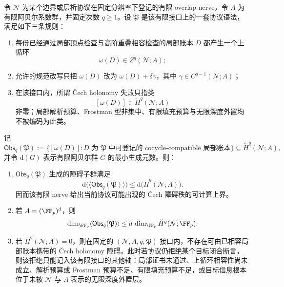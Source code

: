 \begin{theorem}\label{distill:cech_cohomology-finite_nerve_obstruction_bounds-typed-boundary-nerve-rank-ceiling}
令 \(\mathcal N\) 为某个边界或层析协议在固定分辨率下登记的有限 overlap nerve，令 \(A\) 为有限阿贝尔系数群，并固定次数 \(q\ge1\)。设 \(\mathfrak P\) 是该有限接口上的一套协议语法，满足如下三条规则：
\begin{enumerate}
  \item 每份已经通过局部顶点检查与高阶重叠相容检查的局部账本 \(D\) 都产生一个上循环
  \[
  \omega(D)\in Z^q(\mathcal N;A);
  \]
  \item 允许的规范改写只把 \(\omega(D)\) 改为 \(\omega(D)+\delta\gamma\)，其中 \(\gamma\in C^{q-1}(\mathcal N;A)\)；
  \item 在该接口内，所谓 \v Cech holonomy 失败只指类
  \[
  [\omega(D)]\in \check H^q(\mathcal N;A)
  \]
  非零；局部解析预算、Frostman 型非集中、有限填充预算与无限深度外置均不被编码为此类。
\end{enumerate}
记
\[
\mathsf{Obs}_q(\mathfrak P)
:=\{[\omega(D)]:D\text{ 为 }\mathfrak P\text{ 中可登记的 cocycle-compatible 局部账本}\}
\subseteq \check H^q(\mathcal N;A),
\]
并令 \(\mathrm d(G)\) 表示有限阿贝尔群 \(G\) 的最小生成元数。则：
\begin{enumerate}
  \item \(\mathsf{Obs}_q(\mathfrak P)\) 生成的障碍子群满足
  \[
  \mathrm d\bigl(\langle\mathsf{Obs}_q(\mathfrak P)\rangle\bigr)
  \le
  \mathrm d\bigl(\check H^q(\mathcal N;A)\bigr).
  \]
  因而该有限 nerve 给出当前协议可能出现的 \v Cech 障碍秩的可计算上界。
  \item 若 \(A=(\FF_p)^d\)，则
  \[
  \dim_{\FF_p}\langle\mathsf{Obs}_q(\mathfrak P)\rangle
  \le
  d\,\dim_{\FF_p}\check H^q(\mathcal N;\FF_p).
  \]
  \item 若 \(\check H^q(\mathcal N;A)=0\)，则在固定的 \((\mathcal N,A,q,\mathfrak P)\) 接口内，不存在可由已相容局部账本携带的 \v Cech holonomy 障碍。此时若协议仍拒绝某个目标闭合断言，则该拒绝只能记入该有限接口的其他轴：局部证书未通过、上循环相容性尚未成立、解析预算或 Frostman 预算不足、有限填充预算不足，或目标信息根本位于未被 \(\mathcal N\) 与 \(A\) 表示的无限深度外置层。
\end{enumerate}
\end{theorem}
